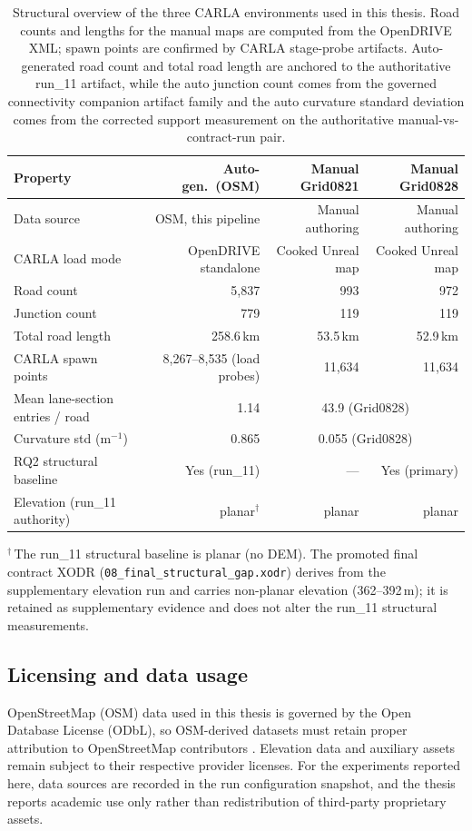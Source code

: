 \begin{table}[ht]
\centering
\caption[Structural overview of the three CARLA environments (auto-gen., Grid0821, Grid0828).]{Structural overview of the three CARLA environments used in this thesis. Road counts and lengths for the manual maps are computed from the OpenDRIVE XML; spawn points are confirmed by CARLA stage-probe artifacts. Auto-generated road count and total road length are anchored to the authoritative run\_11 artifact, while the auto junction count comes from the governed connectivity companion artifact family and the auto curvature standard deviation comes from the corrected support measurement on the authoritative manual-vs-contract-run pair.}
\label{tab:env_comparison}
\footnotesize
\begin{tabular}{lrrr}
\hline
Property & Auto-gen.\ (OSM) & Manual Grid0821 & Manual Grid0828 \\
\hline
Data source & OSM, this pipeline & Manual authoring & Manual authoring \\
CARLA load mode & OpenDRIVE standalone & Cooked Unreal map & Cooked Unreal map \\
Road count & 5,837 & 993 & 972 \\
Junction count & 779 & 119 & 119 \\
Total road length & 258.6\,km & 53.5\,km & 52.9\,km \\
CARLA spawn points & 8{,}267--8{,}535 (load probes) & 11,634 & 11,634 \\
Mean lane-section entries / road & 1.14 & \multicolumn{2}{c}{43.9 (Grid0828)} \\
Curvature std (m$^{-1}$) & 0.865 & \multicolumn{2}{c}{0.055 (Grid0828)} \\
RQ2 structural baseline & Yes (run\_11) & --- & Yes (primary) \\
Elevation (run\_11 authority) & planar$^\dagger$ & planar & planar \\
\hline
\end{tabular}
\par\smallskip
{\footnotesize $^\dagger$\,The run\_11 structural baseline is planar (no DEM). The promoted final contract XODR (\texttt{08\_final\_structural\_gap.xodr}) derives from the supplementary elevation run and carries non-planar elevation (362--392\,m); it is retained as supplementary evidence and does not alter the run\_11 structural measurements.}
\end{table}


\subsection{Licensing and data usage}
\label{sec:licensing}
OpenStreetMap (OSM) data used in this thesis is governed by the Open Database License
(ODbL), so OSM-derived datasets must retain proper attribution to OpenStreetMap
contributors \cite{osm_copyright,odbl10}. Elevation data and auxiliary assets remain
subject to their respective provider licenses. For the experiments reported here, data
sources are recorded in the run configuration snapshot, and the thesis reports academic
use only rather than redistribution of third-party proprietary assets.


